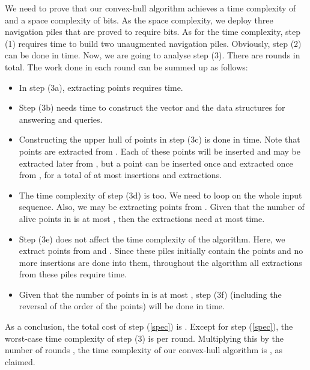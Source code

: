 \documentclass[final,onetabnum,onefignum,onethmnum]{siamltex}
\newcommand{\Rank}{\mbox{}}
\newcommand{\Select}{\mbox{}}
\newcommand{\MinOne}{\mbox{}}
\newcommand{\MinTwo}{\mbox{}}
\newcommand{\MaxPile}{\mbox{}}
\begin{document}
We need to prove that our convex-hull algorithm achieves a time
complexity of  and a space complexity of
 bits. As the space complexity, we deploy three
navigation piles that are proved to require  bits. As
for the time complexity, step (1) requires  time to build two
unaugmented navigation piles. Obviously, step (2) can
be done in  time. Now, we are going to analyse step (3). There
are  rounds in total. The work done in each round
can be summed up as follows:

\begin{itemize}

\item In step (3a), extracting  points requires 
  time.

\item Step (3b) needs  time to construct the 
  vector and the data structures for answering \Rank{} and \Select{}
  queries.

\item Constructing the upper hull of  points in step (3c) is done in
   time.
Note that  points are extracted from \MinTwo{}. Each of these
points will be inserted and may be extracted later from \MaxPile{}, but
a point can be inserted once and extracted once from \MaxPile{}, for a
total of at most  insertions and  extractions.

\item The time complexity of step (3d) is  too. We need
   to loop on the whole input sequence. Also, we may be
  extracting points from \MaxPile{}. Given that the number of alive
  points in \MaxPile{} is at most , then the extractions need at
  most  time.

\item Step (3e) does not affect the time complexity of the
  algorithm. Here, we extract points from \MinOne{} and
  \MinTwo{}. Since these piles initially contain the  points and no
  more insertions are done into them, throughout the algorithm all
  extractions from these piles require  time.

\item Given that the number of points in \MaxPile{} is at most ,
  step (3f) (including the reversal of the order of the points) 
	will be done in  time.
\end{itemize}

As a conclusion, the total cost of step (\ref{spec}) is . Except for step (\ref{spec}), the worst-case time complexity
of step (3) is  per round. Multiplying this by the
number of rounds , the time complexity of our
convex-hull algorithm is , as claimed.
\end{document}
